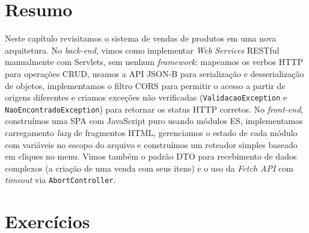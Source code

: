 \section{Resumo}

Neste capítulo revisitamos o sistema de vendas de produtos em uma nova arquitetura. No \textit{back-end}, vimos como implementar \textit{Web Services} RESTful manualmente com Servlets, sem nenhum \textit{framework}: mapeamos os verbos HTTP para operações CRUD, usamos a API JSON-B para serialização e desserialização de objetos, implementamos o filtro CORS para permitir o acesso a partir de origens diferentes e criamos exceções não verificadas (\texttt{ValidacaoException} e \texttt{NaoEncontradoException}) para retornar os status HTTP corretos. No \textit{front-end}, construímos uma SPA com JavaScript puro usando módulos ES, implementamos carregamento \textit{lazy} de fragmentos HTML, gerenciamos o estado de cada módulo com variáveis no escopo do arquivo e construímos um roteador simples baseado em cliques no menu. Vimos também o padrão DTO para recebimento de dados complexos (a criação de uma venda com seus itens) e o uso da \textit{Fetch API} com \textit{timeout} via \texttt{AbortController}.

\section{Exercícios}


